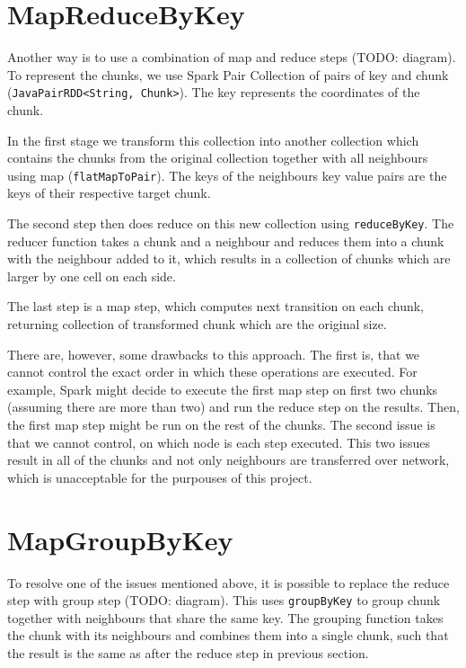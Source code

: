 \documentclass{l4proj}
\begin{document}
\section{MapReduceByKey}

Another way is to use a combination of map and reduce steps (TODO: diagram). To represent the 
chunks, we use Spark Pair Collection of pairs of key and chunk (\texttt{JavaPairRDD<String, Chunk>}). The key represents
the coordinates of the chunk.

In the first stage we transform this collection into another collection which contains
the chunks from the original collection together with all neighbours using map
(\texttt{flatMapToPair}). The keys of the neighbours key value pairs are the keys of their respective
target chunk.

The second step then does reduce on this new collection using \texttt{reduceByKey}. 
The reducer function takes a chunk and a neighbour and reduces them into a chunk
with the neighbour added to it, which results in a collection of chunks which are
larger by one cell on each side.

The last step is a map step, which computes next transition on each chunk, returning
collection of transformed chunk which are the original size.

There are, however, some drawbacks to this approach. The first is, that we cannot
control the exact order in which these operations are executed. For example, Spark
might decide to execute the first map step on first two chunks (assuming there are more than two)
and run the reduce step on the results. Then, the first map step might be run on the rest
of the chunks. The second issue is that we cannot control, on which node is each step 
executed. This two issues result in all of the chunks and not only neighbours are
transferred over network, which is unacceptable for the purpouses of this project.

\section{MapGroupByKey}

To resolve one of the issues mentioned above, it is possible to replace the reduce
step with group step (TODO: diagram). This uses \texttt{groupByKey} to group chunk together with
neighbours that share the same key. The grouping function takes the chunk with
its neighbours and combines them into a single chunk, such that the result is the
same as after the reduce step in previous section.
\end{document}
